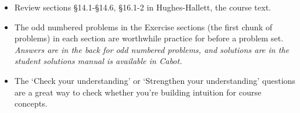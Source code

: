 \documentclass[12pt,letterpaper,noanswers]{exam}
\begin{document}
 \pdfpageheight 11in 
  \pdfpagewidth 8.5in
  
\begin{itemize}
    \item Review sections \S 14.1-\S 14.6, \S 16.1-2 in Hughes-Hallett, the course text.
    \item The odd numbered problems in the Exercise sections (the first chunk of problems) in each section are worthwhile practice for before a problem set.  \emph{Answers are in the back for odd numbered problems, and solutions are in the student solutions manual is available in Cabot.}
    \item The `Check your understanding' or `Strengthen your understanding' questions are a great way to check whether you're building intuition for course concepts. %
\end{itemize}
\end{document}

